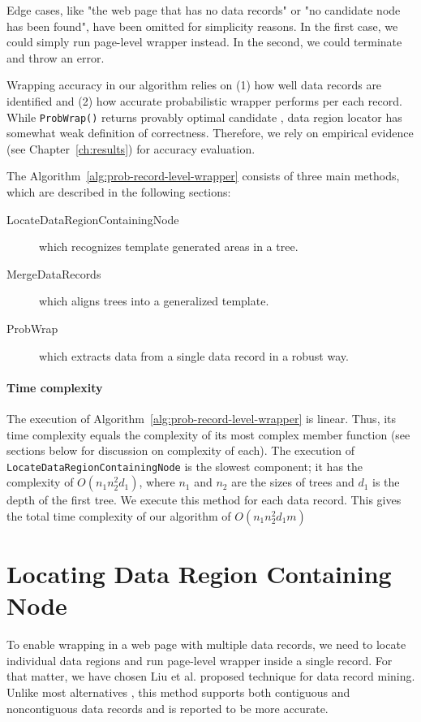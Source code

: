 Edge cases, like "the web page that has no data records" or "no candidate node has been found", have been omitted for simplicity reasons. In the first case, we could simply run page-level wrapper instead. In the second, we could terminate and throw an error. 

Wrapping accuracy in our algorithm relies on (1) how well data records are identified and (2) how accurate probabilistic wrapper performs per each record. While \texttt{ProbWrap()} returns provably optimal candidate \cite{DBLP:journals/pvldb/ParameswaranDGR11}, data region locator has somewhat weak definition of correctness. Therefore, we rely on empirical evidence (see Chapter~\ref{ch:results}) for accuracy evaluation.

The Algorithm~\ref{alg:prob-record-level-wrapper} consists of three main methods, which are described in the following sections:
\begin{description}
	\item[LocateDataRegionContainingNode] which recognizes template generated areas in a tree.
	\item[MergeDataRecords] which aligns trees into a generalized template.
	\item[ProbWrap] which extracts data from a single data record in a robust way.
\end{description}

\paragraph{Time complexity} The execution of Algorithm~\ref{alg:prob-record-level-wrapper} is linear. Thus, its time complexity equals the complexity of its most complex member function (see sections below for discussion on complexity of each). The execution of \texttt{LocateDataRegionContainingNode} is the slowest component; it has the complexity of $O(n_1 n_2^2 d_1)$, where $n_1$ and $n_2$ are the sizes of trees and $d_1$ is the depth of the first tree. We execute this method for each data record. This gives the total time complexity of our algorithm of $O(n_1 n_2^2 d_1 m)$


\section{Locating Data Region Containing Node}

To enable wrapping in a web page with multiple data records, we need to locate individual data regions and run page-level wrapper inside a single record. For that matter, we have chosen Liu et al. \cite{liu2009a} proposed technique for data record mining. Unlike most alternatives \cite{buttler2001a} \cite{csie2009a} \cite{jiang2009a} \cite{lerman2004a}, this method supports both contiguous and noncontiguous data records and is reported to be more accurate.


